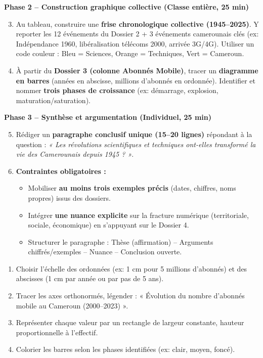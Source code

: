 \documentclass[11pt]{article}
\newcommand{\cle}[1]{{\popxbold\color{popdark}#1}}
\newcounter{popsec}
\newcounter{popsub}
\newcommand{\courssub}[1]{%
  \stepcounter{popsub}%
  \par\vspace{9pt}\noindent{\popxbold\fontsize{11.5}{13}\selectfont\color{popink}{\color{poporange}\thepopsec.\thepopsub}\hspace{6pt}#1}\par\nopagebreak\vspace{4pt}
}
\begin{document}
\medskip
\noindent \textbf{Phase 2 -- Construction graphique collective (Classe entière, 25 min)}
\begin{enumerate}
    \setcounter{enumi}{2}
    \item Au tableau, construire une \textbf{frise chronologique collective (1945--2025)}. Y reporter les 12 événements du Dossier 2 + 3 événements camerounais clés (ex: Indépendance 1960, libéralisation télécoms 2000, arrivée 3G/4G). Utiliser un code couleur : \textcolor{popblue}{Bleu = Sciences}, \textcolor{poporange}{Orange = Techniques}, \textcolor{popgreen}{Vert = Cameroun}.
    \item À partir du \textbf{Dossier 3 (colonne Abonnés Mobile)}, tracer un \textbf{diagramme en barres} (années en abscisse, millions d'abonnés en ordonnée). Identifier et nommer \textbf{trois phases de croissance} (ex: démarrage, explosion, maturation/saturation).
\end{enumerate}

\medskip
\noindent \textbf{Phase 3 -- Synthèse et argumentation (Individuel, 25 min)}
\begin{enumerate}
    \setcounter{enumi}{4}
    \item Rédiger un \textbf{paragraphe conclusif unique (15--20 lignes)} répondant à la question : \emph{« Les révolutions scientifiques et techniques ont-elles transformé la vie des Camerounais depuis 1945 ? »}.
    \item \textbf{Contraintes obligatoires :}
    \begin{itemize}
        \item Mobiliser \textbf{au moins trois exemples précis} (dates, chiffres, noms propres) issus des dossiers.
        \item Intégrer \textbf{une nuance explicite} sur la \cle{fracture numérique} (territoriale, sociale, économique) en s'appuyant sur le Dossier 4.
        \item Structurer le paragraphe : Thèse (affirmation) -- Arguments chiffrés/exemples -- Nuance -- Conclusion ouverte.
    \end{itemize}
\end{enumerate}

\courssub{Ressources à mobiliser}
\begin{methode}
\begin{enumerate}
    \item Choisir l'échelle des ordonnées (ex: 1 cm pour 5 millions d'abonnés) et des abscisses (1 cm par année ou par pas de 5 ans).
    \item Tracer les axes orthonormés, légender : « Évolution du nombre d'abonnés mobile au Cameroun (2000--2023) ».
    \item Représenter chaque valeur par un rectangle de largeur constante, hauteur proportionnelle à l'effectif.
    \item Colorier les barres selon les phases identifiées (ex: clair, moyen, foncé).
\end{enumerate}
\end{methode}
\end{document}
